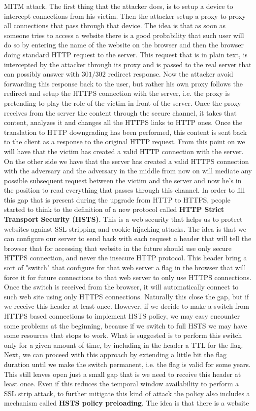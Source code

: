 MITM attack. The first thing that the attacker does, is to setup a device to intercept connections from his victim. Then the attacker setup a proxy to proxy all connections that pass through that device. The idea is that as soon as someone tries to access a website there is a good probability that such user will do so by entering the name of the website on the browser and then the browser doing standard HTTP request to the server. This request that is in plain text, is intercepted by the attacker through its proxy and is passed to the real server that can possibly answer with $301/302$ redirect response. Now the attacker avoid forwarding this response back to the user, but rather his own proxy follows the redirect and setup the HTTPS connection with the server, i.e. the proxy is pretending to play the role of the victim in front of the server. Once the proxy receives from the server the content through the secure channel, it takes that content, analyzes it and changes all the HTTPS links to HTTP ones. Once the translation to HTTP downgrading has been performed, this content is sent back to the client as a response to the original HTTP request. From this point on we will have that the victim has created a valid HTTP connection with the server. On the other side we have that the server has created a valid HTTPS connection with the adversary and the adversary in the middle from now on will mediate any possible subsequent request between the victim and the server and now he's in the position to read everything that passes through this channel. In order to fill this gap that is present during the upgrade from HTTP to HTTPS, people started to think to the definition of a new protocol called \textbf{HTTP Strict Transport Security (HSTS)}. This is a web security that helps us to protect websites against SSL stripping and cookie hijacking attacks. The idea is that we can configure our server to send back with each request a header that will tell the browser that for accessing that website in the future should use only secure HTTPS connection, and never the insecure HTTP protocol. This header bring a sort of "switch" that configure for that web server a flag in the browser that will force it for future connections to that web server to only use HTTPS connections. Once the switch is received from the browser, it will automatically connect to such web site using only HTTPS connections. Naturally this close the gap, but if we receive this header at least once. However, if we decide to make a switch from HTTPS based connections to implement HSTS policy, we may easy encounter some problems at the beginning, because if we switch to full HSTS we may have some resources that stops to work. What is suggested is to perform this switch only for a given amount of time, by including in the header a TTL for the flag. Next, we can proceed with this approach by extending a little bit the flag duration until we make the switch permanent, i.e. the flag is valid for some years. This still leaves open just a small gap that is we need to receive this header at least once. Even if this reduces the temporal window availability to perform a SSL strip attack, to further mitigate this kind of attack the policy also includes a mechanism called \textbf{HSTS policy preloading}. The idea is that there is a website 